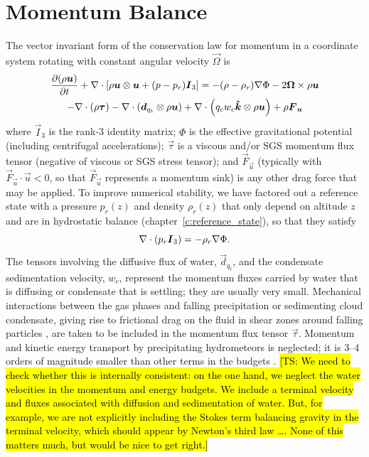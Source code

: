 \documentclass{report}
\begin{document}
\section{Momentum Balance}

The vector invariant form of the conservation law for momentum in a coordinate system rotating with constant angular velocity $\vec{\Omega}$ is 
\begin{multline}
\frac{\partial (\rho\boldsymbol{{u}})}{\partial t} + \nabla \cdot \left[ \rho\boldsymbol{{u}} \otimes \boldsymbol{{u}} + (p - p_r) \boldsymbol{{I}}_3\right] =
- (\rho - \rho_r) \nabla\Phi - 2\boldsymbol{{\Omega}} \times \rho\boldsymbol{{u}} \\
- \nabla \cdot (\rho \boldsymbol{{\tau}}) - \nabla \cdot\left( \boldsymbol{{d}}_{q_t} \otimes \rho\boldsymbol{{u}} \right) + \nabla \cdot \left( q_c w_c \boldsymbol{{\hat k}} \otimes \rho \boldsymbol{{u}} \right) + \rho \boldsymbol{{F}}_{\boldsymbol{{u}}}
\label{eq:governing_equations/momentum}
\end{multline}
where $\vec{I}_3$ is the rank-3 identity matrix; $\Phi$ is the effective gravitational potential (including centrifugal accelerations); $\vec{\tau}$ is a viscous and/or SGS momentum flux tensor (negative of viscous or SGS stress tensor); and $\vec{F}_{\vec{u}}$ (typically with $\vec{F}_{\vec{u}}\cdot\vec{u}<0$, so that $\vec{F}_{\vec{u}}$ represents a momentum sink) is any other drag force that may be applied. To improve numerical stability, we have factored out a reference state with a pressure $p_r(z)$ and density $\rho_r(z)$ that only depend on altitude $z$ and are in hydrostatic balance (chapter~\ref{c:reference_state}), so that they satisfy
\[
\nabla \cdot (p_r \boldsymbol{{I}}_3)  = - \rho_r \nabla\Phi. 
\]
The tensors involving the diffusive flux of water, $\vec{d}_{q_t}$, and the condensate sedimentation velocity,  $w_c$, represent the momentum fluxes carried by water that is diffusing or condensate that is settling; they are usually very small. Mechanical interactions between the gas phases and falling precipitation or sedimenting cloud condensate, giving rise to frictional drag on the fluid in shear zones around falling particles \citep{Pauluis00}, are taken to be included in the momentum flux tensor $\vec{\tau}$. Momentum and kinetic energy transport by precipitating hydrometeors is neglected; it is 3--4 orders of magnitude smaller than other terms in the budgets \citep{Romps08a}. \hl{[TS: We need to check whether this is internally consistent: on the one hand, we neglect the water velocities in the  momentum and energy budgets. We include a terminal velocity and fluxes associated with diffusion and sedimentation of water. But, for example, we are not explicitly including the Stokes term balancing gravity in the terminal velocity, which should appear by Newton's third law \dots. None of this matters much, but would be nice to get right.]} 
\end{document}
